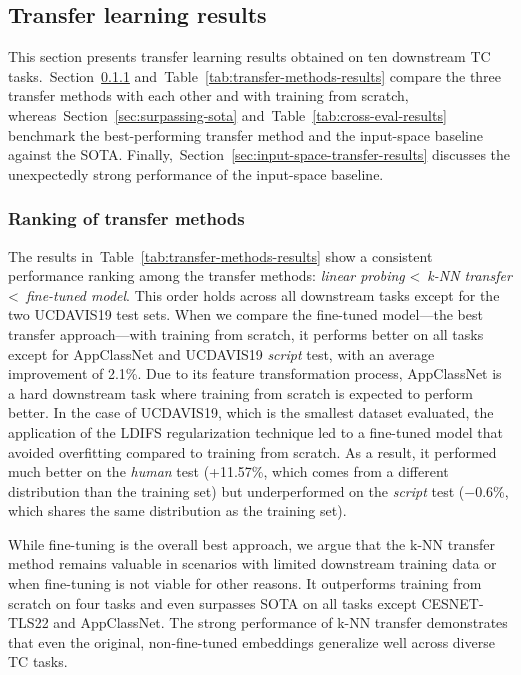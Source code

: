\documentclass[lettersize,journal,twoside,article]{IEEEtran}
\newcommand{\secref}[1]{Section~\ref{#1}}
\newcommand{\tabref}[1]{Table~\ref{#1}}
\begin{document}
\subsection{Transfer learning results}
This section presents transfer learning results obtained on ten downstream TC tasks.~\secref{sec:ranking-transfer-methods} and~\tabref{tab:transfer-methods-results} compare the three transfer methods with each other and with training from scratch, whereas~\secref{sec:surpassing-sota} and~\tabref{tab:cross-eval-results} benchmark the best-performing transfer method and the input-space baseline against the SOTA. Finally,~\secref{sec:input-space-transfer-results} discusses the unexpectedly strong performance of the input-space baseline.

\subsubsection{Ranking of transfer methods}
\label{sec:ranking-transfer-methods}
The results in~\tabref{tab:transfer-methods-results} show a consistent performance ranking among the transfer methods: \textit{linear probing} \textless~\textit{k-NN transfer} \textless~\textit{fine-tuned model}. This order holds across all downstream tasks except for the two UCDAVIS19 test sets. When we compare the fine-tuned model---the best transfer approach---with training from scratch, it performs better on all tasks except for AppClassNet and UCDAVIS19 \textit{script} test, with an average improvement of 2.1\%. Due to its feature transformation process, AppClassNet is a hard downstream task where training from scratch is expected to perform better. In the case of UCDAVIS19, which is the smallest dataset evaluated, the application of the LDIFS regularization technique led to a fine-tuned model that avoided overfitting compared to training from scratch. As a result, it performed much better on the \textit{human} test (+11.57\%, which comes from a different distribution than the training set) but underperformed on the \textit{script} test ($-$0.6\%, which shares the same distribution as the training set). 

While fine-tuning is the overall best approach, we argue that the k-NN transfer method remains valuable in scenarios with limited downstream training data or when fine-tuning is not viable for other reasons. It outperforms training from scratch on four tasks and even surpasses SOTA on all tasks except CESNET-TLS22 and AppClassNet. The strong performance of k-NN transfer demonstrates that even the original, non-fine-tuned embeddings generalize well across diverse TC tasks. 
\end{document}
